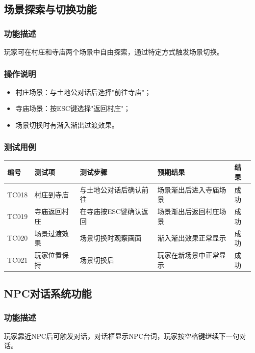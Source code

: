 \documentclass[a4paper,12pt]{article}
\begin{document}
\subsection{场景探索与切换功能}

\subsubsection{功能描述}
玩家可在村庄和寺庙两个场景中自由探索，通过特定方式触发场景切换。

\subsubsection{操作说明}
\begin{itemize}[leftmargin=2em]
    \item 村庄场景：与土地公对话后选择"前往寺庙"；
    \item 寺庙场景：按ESC键选择"返回村庄"；
    \item 场景切换时有渐入渐出过渡效果。
\end{itemize}

\subsubsection{测试用例}
\begin{longtable}{p{1.2cm} p{2.8cm} p{4cm} p{3.5cm} p{1.5cm}}
\toprule
\textbf{编号} & \textbf{测试项} & \textbf{测试步骤} & \textbf{预期结果} & \textbf{结果} \\
\midrule
\endhead
TC018 & 村庄到寺庙 & 与土地公对话后确认前往 & 场景渐出后进入寺庙场景 & 成功 \\
TC019 & 寺庙返回村庄 & 在寺庙按ESC键确认返回 & 场景渐出后返回村庄场景 & 成功 \\
TC020 & 场景过渡效果 & 场景切换时观察画面 & 渐入渐出效果正常显示 & 成功 \\
TC021 & 玩家位置保持 & 场景切换后 & 玩家在新场景中正常显示 & 成功 \\
\bottomrule
\end{longtable}

\subsection{NPC对话系统功能}

\subsubsection{功能描述}
玩家靠近NPC后可触发对话，对话框显示NPC台词，玩家按空格键继续下一句对话。
\end{document}
